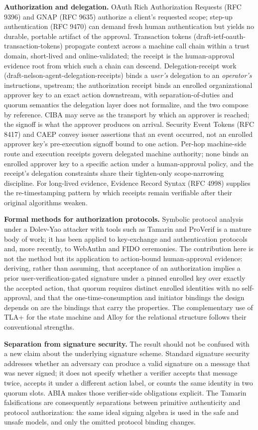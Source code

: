 \documentclass[11pt]{article}
\begin{document}
\textbf{Authorization and delegation.} OAuth Rich Authorization Requests (RFC 9396)
and GNAP (RFC 9635) authorize a client's requested scope; step-up authentication
(RFC 9470) can demand fresh human authentication but yields no durable, portable
artifact of the approval. Transaction tokens (draft-ietf-oauth-transaction-tokens)
propagate context across a machine call chain within a trust domain, short-lived and
online-validated; the receipt is the human-approval evidence root from which such a chain
can descend. Delegation-receipt work (draft-nelson-agent-delegation-receipts) binds
a \emph{user's} delegation to an \emph{operator's} instructions, upstream; the
authorization receipt binds an enrolled organizational approver key to an exact action
downstream, with separation-of-duties and quorum semantics the delegation layer does
not formalize, and the two compose by reference. CIBA may serve as the transport by
which an approver is reached; the signoff is what the approver produces on arrival.
Security Event Tokens (RFC 8417) and CAEP convey issuer assertions that an event
occurred, not an enrolled approver key's pre-execution signoff bound to one action.
Per-hop machine-side route and execution receipts govern delegated machine
authority; none binds an enrolled approver key to a specific action under a
human-approval policy, and the receipt's delegation constraints share their
tighten-only scope-narrowing discipline. For long-lived evidence, Evidence Record
Syntax (RFC 4998) supplies the re-timestamping pattern by which receipts remain
verifiable after their original algorithms weaken.

\textbf{Formal methods for authorization protocols.} Symbolic protocol analysis
under a Dolev-Yao attacker with tools such as Tamarin and ProVerif is a mature body
of work; it has been applied to key-exchange and authentication protocols and, more
recently, to WebAuthn and FIDO ceremonies. The contribution here is not the method
but its application to action-bound human-approval evidence: deriving, rather than
assuming, that acceptance of an authorization implies a prior
user-verification-gated signature under a pinned enrolled key over exactly the
accepted action, that quorum requires distinct enrolled identities with no
self-approval, and that the one-time-consumption and initiator
bindings the design depends on are the bindings that carry the properties. The
complementary use of TLA+ for the state machine and Alloy for the relational
structure follows their conventional strengths.

\textbf{Separation from signature security.} The result should not be confused
with a new claim about the underlying signature scheme. Standard signature
security addresses whether an adversary can produce a valid signature on a
message that was never signed; it does not specify whether a verifier accepts
that message twice, accepts it under a different action label, or counts the
same identity in two quorum slots. ABIA makes those verifier-side obligations
explicit. The Tamarin falsifications are consequently separations between
primitive authenticity and protocol authorization: the same ideal signing
algebra is used in the safe and unsafe models, and only the omitted protocol
binding changes.
\end{document}
